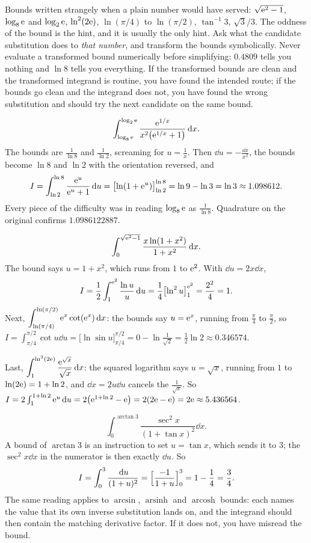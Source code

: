 \cue Bounds written strangely when a plain number would have served: $\sqrt{\mathrm{e}^{2}-1}$, $\log_{8}\mathrm{e}$ and $\log_{2}\mathrm{e}$, $\ln^{2}(2\mathrm{e})$, $\ln(\pi/4)$ to $\ln(\pi/2)$, $\tan^{-1}3$, $\sqrt{3}/3$. The oddness of the bound is the hint, and it is usually the only hint.
\method Ask what the candidate substitution does to \emph{that number}, and transform the bounds symbolically. Never evaluate a transformed bound numerically before simplifying: $0.4809$ tells you nothing and $\ln8$ tells you everything. If the transformed bounds are clean and the transformed integrand is routine, you have found the intended route; if the bounds go clean and the integrand does not, you have found the wrong substitution and should try the next candidate on the same bound.

\begin{worked}
\[\int_{\log_{8}\mathrm{e}}^{\log_{2}\mathrm{e}}\frac{\mathrm{e}^{1/x}}{x^{2}\bigl(\mathrm{e}^{1/x}+1\bigr)}\,\mathrm{d} x.\]
The bounds are $\tfrac{1}{\ln8}$ and $\tfrac{1}{\ln2}$, screaming for $u=\tfrac1x$. Then $\dd u=-\tfrac{\dd x}{x^{2}}$, the bounds become $\ln8$ and $\ln2$ with the orientation reversed, and
\[I=\int_{\ln2}^{\ln8}\frac{\mathrm{e}^{u}}{\mathrm{e}^{u}+1}\,\mathrm{d} u=\bigl[\ln(1+\mathrm{e}^{u})\bigr]_{\ln2}^{\ln8}=\ln9-\ln3=\ln3\approx1.098612.\]
Every piece of the difficulty was in reading $\log_{8}\mathrm{e}$ as $\tfrac{1}{\ln8}$. Quadrature on the original confirms $1.0986122887$.
\end{worked}

\begin{worked}
\[\int_0^{\sqrt{\mathrm{e}^{2}-1}}\frac{x\ln(1+x^{2})}{1+x^{2}}\,\mathrm{d} x.\]
The bound says $u=1+x^{2}$, which runs from $1$ to $\mathrm{e}^{2}$. With $\dd u=2x\dd x$,
\[I=\frac12\int_1^{\mathrm{e}^{2}}\frac{\ln u}{u}\,\mathrm{d} u=\frac14\bigl[\ln^{2}u\bigr]_1^{\mathrm{e}^{2}}=\frac{2^{2}}{4}=1.\]
Next, $\displaystyle\int_{\ln(\pi/4)}^{\ln(\pi/2)}\mathrm{e}^{x}\cot(\mathrm{e}^{x})\,\mathrm{d} x$: the bounds say $u=\mathrm{e}^{x}$, running from $\tfrac{\pi}{4}$ to $\tfrac{\pi}{2}$, so $I=\int_{\pi/4}^{\pi/2}\cot u\dd u=\bigl[\ln\sin u\bigr]_{\pi/4}^{\pi/2}=0-\ln\tfrac{1}{\sqrt2}=\tfrac12\ln2\approx0.346574$.

Last, $\displaystyle\int_1^{\ln^{2}(2\mathrm{e})}\frac{\mathrm{e}^{\sqrt x}}{\sqrt x}\,\mathrm{d} x$: the squared logarithm says $u=\sqrt x$, running from $1$ to $\ln(2\mathrm{e})=1+\ln2$, and $\dd x=2u\dd u$ cancels the $\tfrac1{\sqrt x}$. So $I=2\int_1^{1+\ln2}\mathrm{e}^{u}\,\mathrm{d} u=2\bigl(\mathrm{e}^{1+\ln2}-\mathrm{e}\bigr)=2(2\mathrm{e}-\mathrm{e})=2\mathrm{e}\approx5.436564$.
\end{worked}

\begin{worked}
\[\int_0^{\arctan3}\frac{\sec^{2}x}{(1+\tan x)^{2}}\dd x.\]
A bound of $\arctan3$ is an instruction to set $u=\tan x$, which sends it to $3$; the $\sec^{2}x\dd x$ in the numerator is then exactly $\dd u$. So
\[I=\int_0^{3}\frac{\,\mathrm{d} u}{(1+u)^{2}}=\Bigl[\frac{-1}{1+u}\Bigr]_0^{3}=1-\frac14=\frac34.\]
The same reading applies to $\arcsin$, $\operatorname{arsinh}$ and $\operatorname{arcosh}$ bounds: each names the value that its own inverse substitution lands on, and the integrand should then contain the matching derivative factor. If it does not, you have misread the bound.
\end{worked}

